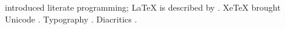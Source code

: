\documentclass{article}
\begin{document}
\citet{knuth1984} introduced literate programming; \LaTeX{} is described by \citet{lamport1994}.
XeTeX brought Unicode \citep{kew2005}. Typography \citep[ch.~2]{bringhurst2004}.
Diacritics \citep{muller2020}.


\end{document}
